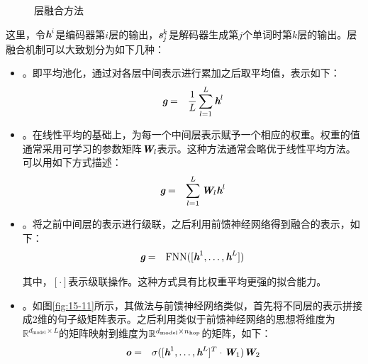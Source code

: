 \begin{figure}[htp]
\centering

\caption{层融合方法}
\label{fig:15-10}
\end{figure}

\parinterval 这里，令$\textbf{\em h}^i$是编码器第$i$层的输出，$\textbf{\em s}^k_{j}$是解码器生成第$j$个单词时第$k$层的输出。层融合机制可以大致划分为如下几种：

\begin{itemize}
\vspace{0.5em}
\item {\small{}}。即平均池化，通过对各层中间表示进行累加之后取平均值，表示如下：
\begin{eqnarray}
\textbf{\em g} &=& \frac{1}{L}\sum_{l=1}^{L}{\textbf{\em h}^l}
\label{eq:15-30}
\end{eqnarray}

\vspace{0.5em}
\item {\small{}}。在线性平均的基础上，为每一个中间层表示赋予一个相应的权重。权重的值通常采用可学习的参数矩阵$\textbf{\em W}_l$表示。这种方法通常会略优于线性平均方法。可以用如下方式描述：
\begin{eqnarray}
\textbf{\em g} &=& \sum_{l=1}^{L}{\textbf{\em W}_l\textbf{\em h}^l}
\label{eq:15-31}
\end{eqnarray}

\vspace{0.5em}
\item {\small{}}。将之前中间层的表示进行级联，之后利用前馈神经网络得到融合的表示，如下：
\begin{eqnarray}
\textbf{\em g} &=& \textrm{FNN}([\textbf{\em h}^1,\ldots,\textbf{\em h}^L])
\label{eq:15-32}
\end{eqnarray}

\noindent 其中，$[\cdot]$表示级联操作。这种方式具有比权重平均更强的拟合能力。
\vspace{0.5em}
\item {\small{}}。如图\ref{fig:15-11}所示，其做法与前馈神经网络类似，首先将不同层的表示拼接成2维的句子级矩阵表示。之后利用类似于前馈神经网络的思想将维度为$\mathbb{R}^{d_{\textrm{model}} \times L}$的矩阵映射到维度为$\mathbb{R}^{d_{\textrm{model}} \times n_{\rm hop}}$的矩阵，如下：
\begin{eqnarray}
\textbf{\em o} &=& \sigma ([\textbf{\em h}^1,\ldots,\textbf{\em h}^L]^{T} \cdot \textbf{\em W}_1)\textbf{\em W}_2
\label{eq:15-33}
\end{eqnarray}


\end{itemize}
